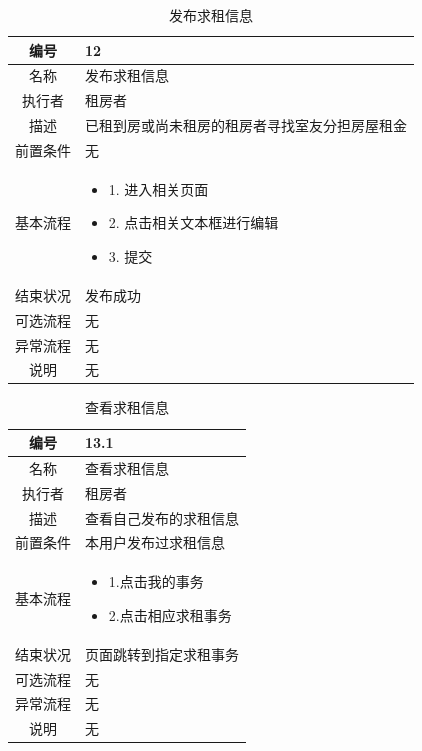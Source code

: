 \begin{table}[htbp]
	\centering
	\begin{tabular}{|c|p{11cm}|}
        \hline
        编号 & 12 \\
        \hline
        名称 & 发布求租信息 \\ 
        \hline
        执行者 & 租房者 \\
        \hline
        描述 & 已租到房或尚未租房的租房者寻找室友分担房屋租金 \\
        \hline
        前置条件 & 无 \\
        \hline
        基本流程 & \begin{itemize}
            \item 1. 进入相关页面
            \item 2. 点击相关文本框进行编辑
            \item 3. 提交
        \end{itemize} \\
        \hline
        结束状况 &发布成功 \\
        \hline
        可选流程 & 无 \\
        \hline
        异常流程 & 无 \\
        \hline
        说明 & 无 \\
        \hline
    \end{tabular}
    \caption{发布求租信息}
\end{table}

\begin{table}[htbp]
	\centering
	\begin{tabular}{|c|p{11cm}|}
        \hline
        编号 & 13.1 \\
        \hline
        名称 & 查看求租信息 \\ 
        \hline
        执行者 &租房者 \\
        \hline
        描述 & 查看自己发布的求租信息 \\
        \hline
        前置条件 & 本用户发布过求租信息 \\
        \hline
        基本流程 & \begin{itemize}
            \item 1.点击我的事务
            \item 2.点击相应求租事务
 
        \end{itemize} \\
        \hline
        结束状况 & 页面跳转到指定求租事务 \\
        \hline
        可选流程 & 无 \\
        \hline
        异常流程 & 无 \\
        \hline
        说明 & 无 \\
        \hline
    \end{tabular}
    \caption{查看求租信息}
\end{table}

